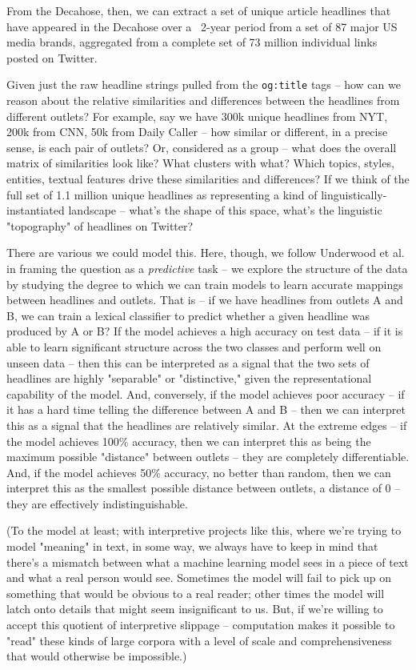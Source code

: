 \documentclass{scrartcl}
\begin{document}
From the Decahose, then, we can extract a set of unique article headlines that have appeared in the Decahose over a ~2-year period from a set of 87 major US media brands, aggregated from a complete set of 73 million individual links posted on Twitter.

Given just the raw headline strings pulled from the \texttt{og:title} tags -- how can we reason about the relative similarities and differences between the headlines from different outlets? For example, say we have 300k unique headlines from NYT, 200k from CNN, 50k from Daily Caller -- how similar or different, in a precise sense, is each pair of outlets? Or, considered as a group -- what does the overall matrix of similarities look like? What clusters with what? Which topics, styles, entities, textual features drive these similarities and differences? If we think of the full set of 1.1 million unique headlines as representing a kind of linguistically-instantiated landscape -- what's the shape of this space, what's the linguistic "topography" of headlines on Twitter?

There are various we could model this. Here, though, we follow Underwood et al. in framing the question as a \textit{predictive} task -- we explore the structure of the data by studying the degree to which we can train models to learn accurate mappings between headlines and outlets. That is -- if we have headlines from outlets A and B, we can train a lexical classifier to predict whether a given headline was produced by A or B? If the model achieves a high accuracy on test data -- if it is able to learn significant structure across the two classes and perform well on unseen data -- then this can be interpreted as a signal that the two sets of headlines are highly "separable" or "distinctive," given the representational capability of the model. And, conversely, if the model achieves poor accuracy -- if it has a hard time telling the difference between A and B -- then we can interpret this as a signal that the headlines are relatively similar. At the extreme edges -- if the model achieves 100\% accuracy, then we can interpret this as being the maximum possible "distance" between outlets -- they are completely differentiable. And, if the model achieves 50\% accuracy, no better than random, then we can interpret this as the smallest possible distance between outlets, a distance of 0 -- they are effectively indistinguishable.

(To the model at least; with interpretive projects like this, where we're trying to model "meaning" in text, in some way, we always have to keep in mind that there's a mismatch between what a machine learning model sees in a piece of text and what a real person would see. Sometimes the model will fail to pick up on something that would be obvious to a real reader; other times the model will latch onto details that might seem insignificant to us. But, if we're willing to accept this quotient of interpretive slippage -- computation makes it possible to "read" these kinds of large corpora with a level of scale and comprehensiveness that would otherwise be impossible.)
\end{document}
